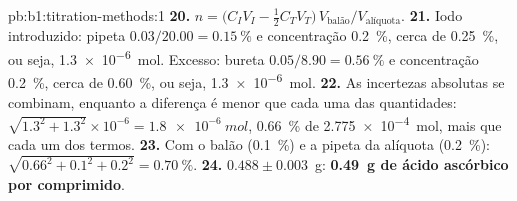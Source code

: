 \begin{solution}{pb:b1:titration-methods:1}
\textbf{20.} $n = \bigl(C_IV_I - \frac12C_TV_T\bigr)\,V_{\text{balão}}/V_{\text{alíquota}}$.
\textbf{21.} Iodo introduzido: pipeta $0.03/20.00 = \qty{0.15}{\percent}$
e concentração \qty{0.2}{\percent}, cerca de \qty{0.25}{\percent}, ou
seja, \qty{1.3e-6}{mol}. Excesso: bureta $0.05/8.90 = \qty{0.56}{\percent}$
e concentração \qty{0.2}{\percent}, cerca de \qty{0.60}{\percent}, ou
seja, \qty{1.3e-6}{mol}.
\textbf{22.} As incertezas absolutas se combinam, enquanto a diferença é
menor que cada uma das quantidades: $\sqrt{1.3^2 + 1.3^2} \times 10^{-6} =
\qty{1.8e-6}{mol}$, \qty{0.66}{\percent} de \qty{2.775e-4}{mol}, mais que
cada um dos termos.
\textbf{23.} Com o balão (\qty{0.1}{\percent}) e a pipeta da alíquota
(\qty{0.2}{\percent}): $\sqrt{0.66^2 + 0.1^2 + 0.2^2} = \qty{0.70}{\percent}$.
\textbf{24.} $0.488 \pm 0.003$~g: \textbf{\qty{0.49}{g} de ácido
ascórbico por comprimido}.
\end{solution}
